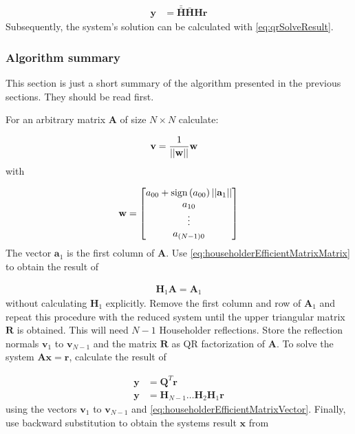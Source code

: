 \begin{align}
\mathbf{y} &= \mathbf{\bar{\bar{H}}}\mathbf{\bar{H}}\mathbf{H}\mathbf{r}
\end{align}
%
Subsequently, the system's solution can be calculated with \cref{eq:qrSolveResult}.



\subsubsection{Algorithm summary}

This section is just a short summary of the algorithm presented in the previous sections.
They should be read first.

For an arbitrary matrix $\mathbf{A}$ of size $N \times N$ calculate:

\begin{align}
\label{eq:qrReflectionUnitNormal}
\mathbf{v} 
&=
\frac{1}{\left\vert\left\vert\mathbf{w}\right\vert\right\vert}\mathbf{w}
\end{align}
%
with 

\begin{align}
\label{eq:qrReflectionNormal}
\mathbf{w} = 
\begin{bmatrix}
a_{00} + \textrm{sign}\left(a_{00}\right) \left\vert\left\vert\mathbf{a}_1\right\vert\right\vert\\
a_{10}\\
\vdots\\
a_{\left(N-1\right)0}
\end{bmatrix}
\end{align}
%
The vector $\mathbf{a}_1$ is the first column of $\mathbf{A}$. 
Use \cref{eq:householderEfficientMatrixMatrix} to obtain the result of

\begin{align}
\mathbf{H}_1 \mathbf{A} = \mathbf{A}_1
\end{align}
%
without calculating $\mathbf{H}_1$ explicitly.
Remove the first column and row of $\mathbf{A}_1$ and repeat this procedure with the reduced system until the upper triangular matrix $\mathbf{R}$ is obtained.
This will need $N-1$ Householder reflections.
Store the reflection normals $\mathbf{v}_1$ to $\mathbf{v}_{N-1}$ and the matrix $\mathbf{R}$ as QR factorization of $\mathbf{A}$.
To solve the system $\mathbf{A}\mathbf{x}=\mathbf{r}$, calculate the result of

\begin{align}
\mathbf{y} &= \mathbf{Q}^T\mathbf{r}\\
\mathbf{y} &= \mathbf{H}_{N-1} \hdots \mathbf{H}_{2}\mathbf{H}_{1}\mathbf{r}
\end{align}
%
using the vectors $\mathbf{v}_1$ to $\mathbf{v}_{N-1}$ and \cref{eq:householderEfficientMatrixVector}.
Finally, use backward substitution to obtain the systems result $\mathbf{x}$ from 

